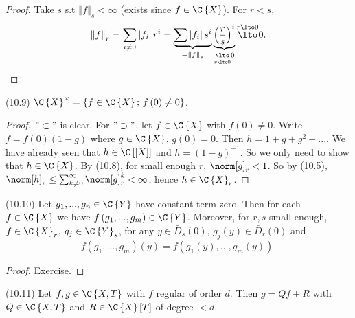 \begin{proof}
Take $s$ s.t $\left\Vert f\right\Vert _{s}<\infty$ (exists since
$f\in\C\left\{ X\right\} $). For $r<s$, 
\[
\left\Vert f\right\Vert _{r}=\sum_{i\neq0}\left|f_{i}\right|r^{i}=\underbrace{\sum\left|f_{i}\right|s^{i}}_{=\left\Vert f\right\Vert _{s}}\underbrace{\left(\frac{r}{s}\right)^{i}}_{\underset{r\lto0}{\lto}0}\overset{r\lto0}{\lto}0.
\]
\end{proof}
\begin{cor*}
(10.9) $\C\left\{ X\right\} ^{\times}=\left\{ f\in\C\left\{ X\right\} ;\, f\left(0\right)\neq0\right\} $.\end{cor*}
\begin{proof}
$"\subset"$ is clear. For $"\supset"$, let $f\in\C\left\{ X\right\} $
with $f\left(0\right)\neq0$. Write $f=f\left(0\right)\left(1-g\right)$
where $g\in\C\left\{ X\right\} $, $g\left(0\right)=0$. Then $h=1+g+g^{2}+...$.
We have already seen that $h\in\C\left[\left[X\right]\right]$ and
$h=\left(1-g\right)^{-1}$. So we only need to show that $h\in\C\left\{ X\right\} $.
By (10.8), for small enough $r$, $\norm[g]_{r}<1$. So by (10.5),
$\norm[h]_{r}\leq\sum_{k\neq0}^{\infty}\norm[g]_{r}^{k}<\infty$,
hence $h\in\C\left\{ X\right\} _{r}$.\end{proof}
\begin{lem*}
(10.10) Let $g_{1},...,g_{n}\in\C\left\{ Y\right\} $ have constant
term zero. Then for each $f\in\C\left\{ X\right\} $ we have $f\left(g_{1},...,g_{m}\right)\in\C\left\{ Y\right\} $.
Moreover, for $r,s$ small enough, $f\in\C\left\{ X\right\} _{r}$,
$g_{j}\in\C\left\{ Y\right\} _{s}$, for any $y\in\bar{D}_{s}\left(0\right)$,
$g_{j}\left(y\right)\in\bar{D}_{r}\left(0\right)$ and
\[
f\left(g_{1},...,g_{m}\right)\left(y\right)=f\left(g_{1}\left(y\right),...,g_{m}\left(y\right)\right).
\]
\end{lem*}
\begin{proof}
Exercise.\end{proof}
\begin{thm*}
(10.11) Let $f,g\in\C\left\{ X,T\right\} $ with $f$ regular of order
$d$. Then $g=Qf+R$ with $Q\in\C\left\{ X,T\right\} $ and $R\in\C\left\{ X\right\} \left[T\right]$
of degree $<d$.\end{thm*}
